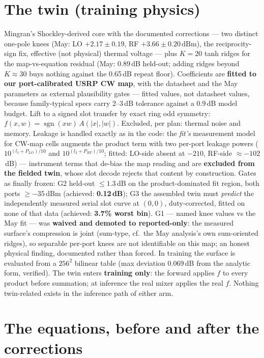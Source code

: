 \documentclass[11pt]{article}
\newcommand{\dbm}{\ensuremath{\,\mathrm{dBm}}}
\begin{document}
\section{The twin (training physics)}
Mingran's Shockley-derived core with the documented corrections ---
two distinct one-pole knees (May: LO $+2.17\pm0.19$, RF
$+3.66\pm0.20$\dbm), the reciprocity-sign fix, effective (not
physical) thermal voltage --- plus $K{=}20$ tanh ridges for the
map-vs-equation residual (May: 0.89\,dB held-out; adding ridges
beyond $K{\approx}30$ buys nothing against the 0.65\,dB repeat
floor). Coefficients are \textbf{fitted to our port-calibrated USRP
CW map}, with the datasheet and the May parameters as external
plausibility gates --- fitted values, not datasheet values, because
family-typical specs carry 2--3\,dB tolerance against a 0.9\,dB
model budget. Lift to a signed slot transfer by exact ring odd
symmetry: $f(x,w)=\operatorname{sgn}(xw)\,A(|x|,|w|)$. Excluded, per
plan: thermal noise and memory. Leakage is handled exactly as in the
code: the \emph{fit's} measurement model for CW-map cells augments the
product term with two per-port leakage powers ($10^{(l_1+P_{LO})/10}$
and $10^{(l_2+P_{RF})/10}$; fitted: LO-side absent at $-210$, RF-side
$\approx-102$\,dB) --- instrument terms that de-bias the map reading
and are \textbf{excluded from the fielded twin}, whose slot decode
rejects that content by construction. Gates as finally frozen: G2 held-out $\le 1.3$\,dB on
the product-dominated fit region, both ports $\ge -35$\dbm{}
(achieved: \textbf{0.12\,dB}); G3 the assembled twin must
\emph{predict} the independently measured serial slot curve at
$(0,0)$, duty-corrected, fitted on none of that data (achieved:
\textbf{3.7\% worst bin}). G1 --- named knee values vs the May fit
--- was \textbf{waived and demoted to reported-only}: the measured
surface's compression is joint (sum-type, cf.\ the May analysis's own
sum-oriented ridges), so separable per-port knees are not
identifiable on this map; an honest physical finding, documented
rather than forced. In training the surface is evaluated from a
$256^2$ bilinear table (max deviation 0.069\,dB from the analytic
form, verified). The twin enters
\textbf{training only}: the forward applies $f$ to every product
before summation; at inference the real mixer applies the real $f$.
Nothing twin-related exists in the inference path of either arm.

\section{The equations, before and after the corrections}
\end{document}
